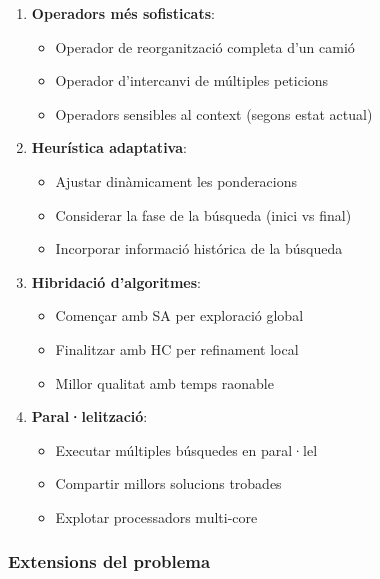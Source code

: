 \begin{enumerate}
    \item \textbf{Operadors més sofisticats}:
    \begin{itemize}
        \item Operador de reorganització completa d'un camió
        \item Operador d'intercanvi de múltiples peticions
        \item Operadors sensibles al context (segons estat actual)
    \end{itemize}
    
    \item \textbf{Heurística adaptativa}:
    \begin{itemize}
        \item Ajustar dinàmicament les ponderacions
        \item Considerar la fase de la búsqueda (inici vs final)
        \item Incorporar informació histórica de la búsqueda
    \end{itemize}
    
    \item \textbf{Hibridació d'algoritmes}:
    \begin{itemize}
        \item Començar amb SA per exploració global
        \item Finalitzar amb HC per refinament local
        \item Millor qualitat amb temps raonable
    \end{itemize}
    
    \item \textbf{Paral·lelització}:
    \begin{itemize}
        \item Executar múltiples búsquedes en paral·lel
        \item Compartir millors solucions trobades
        \item Explotar processadors multi-core
    \end{itemize}
\end{enumerate}

\subsubsection{Extensions del problema}

